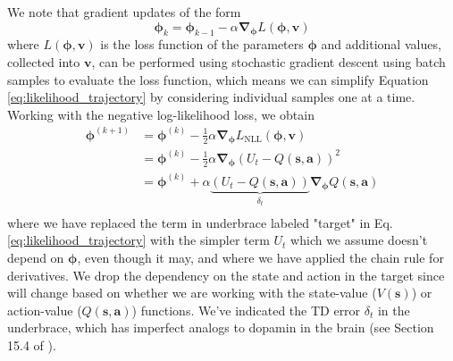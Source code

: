 \documentclass{article}
\begin{document}
We note that gradient updates of the form 
\begin{equation}\label{eq:simple_gradient_update}
\boldsymbol{\phi}_{k}=\boldsymbol{\phi}_{k-1}-\alpha \boldsymbol{\nabla}_{\boldsymbol{\phi}}L(\boldsymbol{\phi},\mathbf{v})
\end{equation}where $L(\boldsymbol{\phi},\mathbf{v})$ is the loss function of the parameters $\boldsymbol{\phi}$ and additional values, collected into $\mathbf{v}$, can be performed using stochastic gradient descent using batch samples to evaluate the loss function, which means we can simplify Equation \ref{eq:likelihood_trajectory} by considering individual samples one at a time. Working with the negative log-likelihood loss, we obtain \begin{equation}\label{eq:semi_gradient}\begin{split}
\boldsymbol{\phi}^{(k+1)}&=\boldsymbol{\phi}^{(k)}-\frac{1}{2}\alpha \boldsymbol{\nabla}_{\boldsymbol{\phi}}L_\text{NLL}(\boldsymbol{\phi},\mathbf{v})\\&=\boldsymbol{\phi}^{(k)}-\frac{1}{2}\alpha \boldsymbol{\nabla}_{\boldsymbol{\phi}}\left(U_t-Q(\mathbf{s},\mathbf{a})\right)^2\\&=\boldsymbol{\phi}^{(k)}+\alpha \underbrace{\left(U_t-Q(\mathbf{s},\mathbf{a})\right)}_{\delta_t}\boldsymbol{\nabla}_{\boldsymbol{\phi}}Q(\mathbf{s},\mathbf{a})\\\end{split}\end{equation} where we have replaced the term in underbrace labeled "target" in Eq. \ref{eq:likelihood_trajectory} with the simpler term $U_t$ which we assume doesn't depend on $\boldsymbol{\phi}$, even though it may, and where we have applied the chain rule for derivatives. We drop the dependency on the state and action in the target since will change based on whether we are working with the state-value ($V(\mathbf{s})$) or action-value ($Q(\mathbf{s},\mathbf{a})$) functions. We've indicated the TD error $\delta_t$ in the underbrace, which has imperfect analogs to dopamin in the brain (see Section 15.4 of \cite{sutton_barto_rl}).
\end{document}
